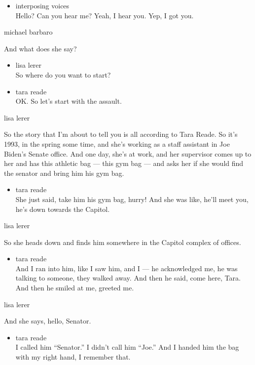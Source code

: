 \begin{itemize}
\tightlist
\item
  interposing voices\\
  Hello? Can you hear me? Yeah, I hear you. Yep, I got you.
\end{itemize}

michael barbaro

And what does she say?

\begin{itemize}
\item
  lisa lerer\\
  So where do you want to start?
\item
  tara reade\\
  OK. So let's start with the assault.
\end{itemize}

lisa lerer

So the story that I'm about to tell you is all according to Tara Reade.
So it's 1993, in the spring some time, and she's working as a staff
assistant in Joe Biden's Senate office. And one day, she's at work, and
her supervisor comes up to her and has this athletic bag --- this gym
bag --- and asks her if she would find the senator and bring him his gym
bag.

\begin{itemize}
\tightlist
\item
  tara reade\\
  She just said, take him his gym bag, hurry! And she was like, he'll
  meet you, he's down towards the Capitol.
\end{itemize}

lisa lerer

So she heads down and finds him somewhere in the Capitol complex of
offices.

\begin{itemize}
\tightlist
\item
  tara reade\\
  And I ran into him, like I saw him, and I --- he acknowledged me, he
  was talking to someone, they walked away. And then he said, come here,
  Tara. And then he smiled at me, greeted me.
\end{itemize}

lisa lerer

And she says, hello, Senator.

\begin{itemize}
\tightlist
\item
  tara reade\\
  I called him ``Senator.'' I didn't call him ``Joe.'' And I handed him
  the bag with my right hand, I remember that.
\end{itemize}

